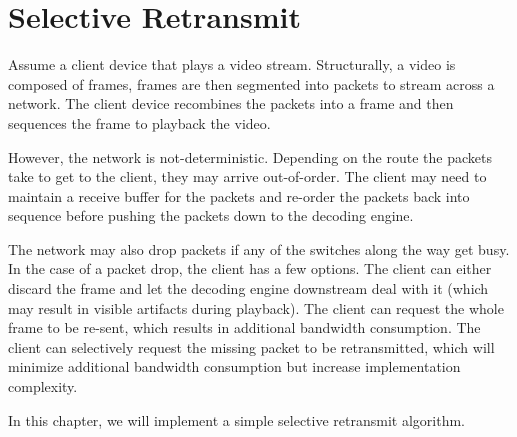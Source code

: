 % 

\chapter{Selective Retransmit}

Assume a client device that plays a video stream. Structurally, a video is
composed of frames, frames are then segmented into packets to stream across a
network. The client device recombines the packets into a frame and then sequences the frame to playback the video.\newline

However, the network is not-deterministic. Depending on the route the packets take
to get to the client, they may arrive out-of-order. The client may need to
maintain a receive buffer for the packets and re-order the packets back into
sequence before pushing the packets down to the decoding engine.\newline

The network may also drop packets if any of the switches along the way get
busy. In the case of a packet drop, the client has a few options. The client can
either discard the frame and let the decoding engine downstream deal with it
(which may result in visible artifacts during playback). The client can
request the whole frame to be re-sent, which results in additional bandwidth consumption.  The client can selectively request the missing packet to be
retransmitted, which will minimize additional bandwidth consumption but
increase implementation complexity.\newline

In this chapter, we will implement a simple selective retransmit
algorithm.\newline

